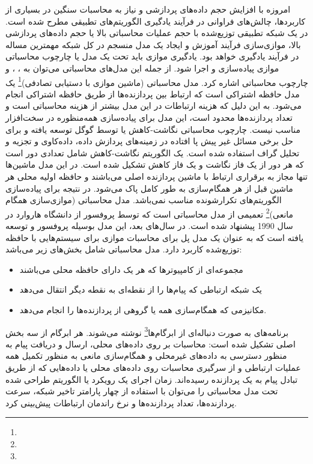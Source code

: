 امروزه با افزایش حجم داده‌های پردازشی و نیاز به محاسبات سنگین در بسیاری از کاربردها، چالش‌های فراوانی در فرآیند یادگیری الگوریتم‌های تطبیقی مطرح شده است. در یک شبکه تطبیقی توزیع‌شده با حجم عملیات محاسباتی بالا یا حجم داده‌های پردازشی بالا، موازی‌سازی فرآیند آموزش و ایجاد یک مدل منسجم در کل شبکه  مهمترین مساله در فرآیند یادگیری خواهد بود. یادگیری موازی باید تحت یک مدل یا چارچوب محاسباتی موازی پیاده‌سازی و اجرا شود. از جمله این مدل‌های محاسباتی می‌توان به ، ،  و چارچوب محاسباتی  اشاره کرد. مدل محاسباتی  (ماشین موازی با دستیابی تصادفی)\footnote{} \cite{Ja1992} یک مدل حافظه اشتراکی است که ارتباط بین پردازنده‌ها از طریق حافظه اشتراکی انجام می‌شود. به این دلیل که هزینه ارتباطات در این مدل بیشتر از هزینه محاسباتی است و تعداد پردازنده‌ها محدود است، این مدل برای پیاده‌سازی همه‌منظوره در سخت‌افزار مناسب نیست. چارچوب محاسباتی نگاشت-کاهش یا  توسط گوگل\cite{De2008} توسعه یافته و برای حل برخی مسائل غیر پیش پا افتاده در زمینه‌های پردازش داده، داده‌کاوی و تجزیه و تحلیل گراف استفاده شده است. یک الگوریتم نگاشت-کاهش شامل تعدادی دور است که هر دور از یک فاز نگاشت و یک فاز کاهش تشکیل شده است. در این مدل ماشین‌ها تنها مجاز به برقراری ارتباط با ماشین پردازنده اصلی می‌باشند و حافظه اولیه محلی هر ماشین قبل از هر همگام‌سازی به طور کامل پاک می‌شود. در نتیجه برای پیاده‌سازی الگوریتم‌های تکرارشونده مناسب نمی‌باشد. مدل محاسباتی  (موازی‌سازی همگام مانعی)\footnote{} \cite{Va1990} تعمیمی از مدل محاسباتی  است که توسط پروفسور  از دانشگاه هاروارد در سال 1990 پیشنهاد شده است. در سال‌های بعد، این مدل بوسیله پروفسور  و  توسعه یافته است که به عنوان یک مدل پل برای محاسبات موازی برای سیستم‌هایی با حافظه توزیع‌شده کاربرد دارد. مدل محاسباتی  شامل بخش‌های زیر می‌باشد:
\begin{itemize}
	\item
	مجموعه‌ای از کامپیوترها که هر یک دارای حافظه محلی می‌باشند
	\item 
	یک شبکه ارتباطی که پیام‌ها را از نقطه‌ای به نقطه دیگر انتقال می‌دهد
	\item 
	مکانیزمی که همگام‌سازی همه یا گروهی از پردازنده‌ها را انجام می‌دهد. 
\end{itemize}
برنامه‌های  به صورت دنباله‌ای از ابرگام‌ها\footnote{} نوشته می‌شوند. هر ابرگام از سه بخش اصلی تشکیل شده است: محاسبات بر روی داده‌های محلی، ارسال و دریافت پیام به منظور دسترسی به داده‌های غیرمحلی و همگام‌سازی مانعی به منظور تکمیل همه عملیات ارتباطی و از سرگیری محاسبات روی داده‌های محلی یا داده‌هایی که از طریق تبادل پیام به یک پردازنده رسیده‌اند. زمان اجرای یک رویکرد یا الگوریتم طراحی شده تحت مدل محاسباتی  را می‌توان با استفاده از چهار پارامتر تاخیر شبکه، سرعت  پردازنده‌ها، تعداد پردازنده‌ها و نرخ راندمان ارتباطات پیش‌بینی کرد. 

